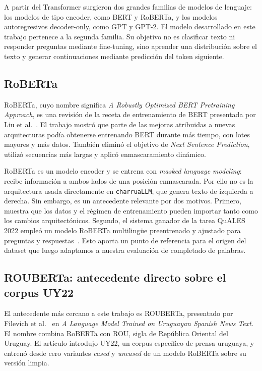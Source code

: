 \documentclass[11pt,a4paper]{article}
\newcommand{\charrua}{\texttt{charruaLLM}}
\begin{document}
A partir del Transformer surgieron dos grandes familias de modelos de lenguaje:
los modelos de tipo encoder, como BERT y RoBERTa, y los modelos autoregresivos
decoder-only, como GPT y GPT-2. El modelo desarrollado en este trabajo pertenece
a la segunda familia. Su objetivo no es clasificar texto ni responder preguntas
mediante fine-tuning, sino aprender una distribución sobre el texto y generar
continuaciones mediante predicción del token siguiente.


\subsection{RoBERTa}

RoBERTa, cuyo nombre significa \emph{A Robustly Optimized BERT Pretraining
Approach}, es una revisión de la receta de entrenamiento de BERT presentada por
Liu et al.~\cite{liu2019}. El trabajo mostró que parte de las mejoras atribuidas
a nuevas arquitecturas podía obtenerse entrenando BERT durante más tiempo, con
lotes mayores y más datos. También eliminó el objetivo de \emph{Next Sentence
Prediction}, utilizó secuencias más largas y aplicó enmascaramiento dinámico.

RoBERTa es un modelo encoder y se entrena con \emph{masked language modeling}:
recibe información a ambos lados de una posición enmascarada. Por ello no es la
arquitectura usada directamente en \charrua, que genera texto de izquierda a
derecha. Sin embargo, es un antecedente relevante por dos motivos. Primero,
muestra que los datos y el régimen de entrenamiento pueden importar tanto como
los cambios arquitectónicos. Segundo, el sistema ganador de la tarea QuALES
2022 empleó un modelo RoBERTa multilingüe preentrenado y ajustado para preguntas
y respuestas~\cite{rosa2022}. Esto aporta un punto de referencia para el origen
del dataset que luego adaptamos a nuestra evaluación de completado de palabras.


\subsection{ROUBERTa: antecedente directo sobre el corpus UY22}

El antecedente más cercano a este trabajo es ROUBERTa, presentado por Filevich
et al.~\cite{filevich2024} en \emph{A Language Model Trained on Uruguayan
Spanish News Text}. El nombre combina RoBERTa con ROU, sigla de República
Oriental del Uruguay. El artículo introdujo UY22, un corpus específico de
prensa uruguaya, y entrenó desde cero variantes \textit{cased} y \textit{uncased} de un modelo
RoBERTa sobre su versión limpia.
\end{document}
